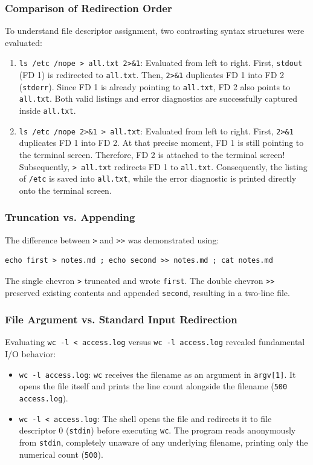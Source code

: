 \documentclass[12pt,a4paper]{article}
\begin{document}
\subsubsection{Comparison of Redirection Order}
To understand file descriptor assignment, two contrasting syntax structures were evaluated:
\begin{enumerate}
    \item \texttt{ls /etc /nope > all.txt 2>\&1}:
    Evaluated from left to right. First, \texttt{stdout} (FD 1) is redirected to \texttt{all.txt}. Then, \texttt{2>\&1} duplicates FD 1 into FD 2 (\texttt{stderr}). Since FD 1 is already pointing to \texttt{all.txt}, FD 2 also points to \texttt{all.txt}. Both valid listings and error diagnostics are successfully captured inside \texttt{all.txt}.
    \item \texttt{ls /etc /nope 2>\&1 > all.txt}:
    Evaluated from left to right. First, \texttt{2>\&1} duplicates FD 1 into FD 2. At that precise moment, FD 1 is still pointing to the terminal screen. Therefore, FD 2 is attached to the terminal screen! Subsequently, \texttt{> all.txt} redirects FD 1 to \texttt{all.txt}. Consequently, the listing of \texttt{/etc} is saved into \texttt{all.txt}, while the error diagnostic is printed directly onto the terminal screen.
\end{enumerate}

\subsubsection{Truncation vs. Appending}
The difference between \texttt{>} and \texttt{>>} was demonstrated using:
\begin{lstlisting}[style=consolestyle]
echo first > notes.md ; echo second >> notes.md ; cat notes.md
\end{lstlisting}
The single chevron \texttt{>} truncated and wrote \texttt{first}. The double chevron \texttt{>>} preserved existing contents and appended \texttt{second}, resulting in a two-line file.

\subsubsection{File Argument vs. Standard Input Redirection}
Evaluating \texttt{wc -l < access.log} versus \texttt{wc -l access.log} revealed fundamental I/O behavior:
\begin{itemize}
    \item \texttt{wc -l access.log}: \texttt{wc} receives the filename as an argument in \texttt{argv[1]}. It opens the file itself and prints the line count alongside the filename (\texttt{500 access.log}).
    \item \texttt{wc -l < access.log}: The shell opens the file and redirects it to file descriptor 0 (\texttt{stdin}) before executing \texttt{wc}. The program reads anonymously from \texttt{stdin}, completely unaware of any underlying filename, printing only the numerical count (\texttt{500}).
\end{itemize}
\end{document}

